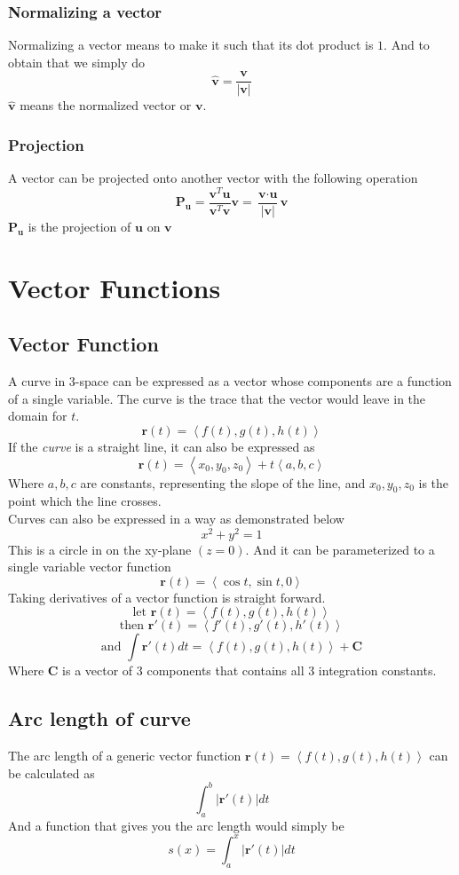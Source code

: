 \documentclass[12pt]{book}
\newcommand{\tribkt}[1]{\left< #1 \right>}
\newcommand{\abso}[1]{\left|#1 \right|}
\begin{document}
\subsubsection{Normalizing a vector}
Normalizing a vector means to make it such that its dot product is $1$. And to obtain that we simply do
\[
\hat{\textbf{v}} = \frac{\textbf{v}}{\abso{\textbf{v}}}
\]
$\hat{\textbf{v}}$ means the normalized vector or $\textbf{v}$.
\subsubsection{Projection}
A vector can be projected onto another vector with the following operation
\[
\textbf{P}_\textbf{u} = \frac{ \textbf{v}^T \textbf{u} }{ \textbf{v}^T\textbf{v}}\textbf{v} = \frac{\textbf{v}\cdot \textbf{u}}{\abso{\textbf{v}}}\textbf{v}
\]
$\textbf{P}_\textbf{u}$ is the projection of $\textbf{u}$ on $\textbf{v}$

\section{Vector Functions}
\subsection{Vector Function}
A curve in 3-space can be expressed as a vector whose components are a function of a single variable. The curve is the trace that the vector would leave in the domain for $t$.
\[
\textbf{r}(t) = \tribkt{f(t),g(t),h(t)}
\]
If the \textit{curve} is a straight line, it can also be expressed as
\[
\textbf{r}(t) = \tribkt{x_0,y_0,z_0} + t\tribkt{a,b,c} 
\]
Where $a,b,c$ are constants, representing the slope of the line, and $x_0,y_0,z_0$ is the point which the line crosses. \\
\newline
Curves can also be expressed in a way as demonstrated below
\[
x^2+y^2=1
\]
This is a circle in on the xy-plane $(z=0)$. And it can be parameterized to a single variable vector function
\[
\textbf{r}(t) = \tribkt{\cos t, \sin t, 0}
\]
Taking derivatives of a vector function is straight forward.
\[
\text{let }\textbf{r}(t) = \tribkt{f(t),g(t),h(t)}
\]
\[
\text{then } \textbf{r}'(t) = \tribkt{f'(t),g'(t),h'(t)}
\]
\[
\text{and } \int \textbf{r}'(t) dt = \tribkt{f(t),g(t),h(t)} + \textbf{C}
\]
Where $\textbf{C}$ is a vector of 3 components that contains all 3 integration constants. 

\subsection{Arc length of curve}
The arc length of a generic vector function $\textbf{r}(t) = \tribkt{f(t),g(t),h(t)}$ can be calculated as 
\[
\int_{a}^{b} \abso{\textbf{r}'(t)} dt
\]
And a function that gives you the arc length would simply be 
\[
s(x) = \int_{a}^{x} \abso{\textbf{r}'(t)} dt
\]
\end{document}
